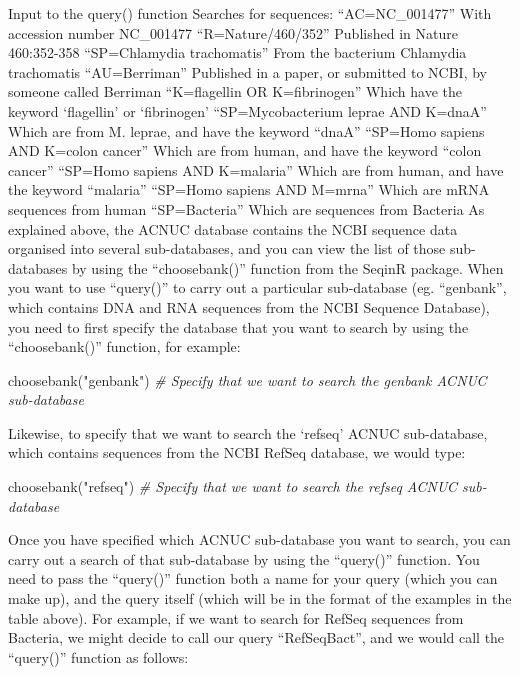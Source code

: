 \documentclass[
]{book}
\newenvironment{Shaded}{\begin{snugshade}}{\end{snugshade}}
\newcommand{\CommentTok}[1]{\textcolor[rgb]{0.56,0.35,0.01}{\textit{#1}}}
\newcommand{\FunctionTok}[1]{\textcolor[rgb]{0.00,0.00,0.00}{#1}}
\newcommand{\NormalTok}[1]{#1}
\newcommand{\StringTok}[1]{\textcolor[rgb]{0.31,0.60,0.02}{#1}}
\begin{document}
Input to the query() function Searches for sequences:
``AC=NC\_001477'' With accession number NC\_001477
``R=Nature/460/352'' Published in Nature 460:352-358
``SP=Chlamydia trachomatis'' From the bacterium Chlamydia trachomatis
``AU=Berriman'' Published in a paper, or submitted to NCBI, by someone called Berriman
``K=flagellin OR K=fibrinogen'' Which have the keyword `flagellin' or `fibrinogen'
``SP=Mycobacterium leprae AND K=dnaA'' Which are from M. leprae, and have the keyword ``dnaA''
``SP=Homo sapiens AND K=colon cancer'' Which are from human, and have the keyword ``colon cancer''
``SP=Homo sapiens AND K=malaria'' Which are from human, and have the keyword ``malaria''
``SP=Homo sapiens AND M=mrna'' Which are mRNA sequences from human
``SP=Bacteria'' Which are sequences from Bacteria
As explained above, the ACNUC database contains the NCBI sequence data organised into several sub-databases, and you can view the list of those sub-databases by using the ``choosebank()'' function from the SeqinR package. When you want to use ``query()'' to carry out a particular sub-database (eg. ``genbank'', which contains DNA and RNA sequences from the NCBI Sequence Database), you need to first specify the database that you want to search by using the ``choosebank()'' function, for example:

\begin{Shaded}
\begin{Highlighting}[]
\FunctionTok{choosebank}\NormalTok{(}\StringTok{"genbank"}\NormalTok{) }\CommentTok{\# Specify that we want to search the \textquotesingle{}genbank\textquotesingle{} ACNUC sub{-}database}
\end{Highlighting}
\end{Shaded}

Likewise, to specify that we want to search the `refseq' ACNUC sub-database, which contains sequences from the NCBI RefSeq database, we would type:

\begin{Shaded}
\begin{Highlighting}[]
\FunctionTok{choosebank}\NormalTok{(}\StringTok{"refseq"}\NormalTok{) }\CommentTok{\# Specify that we want to search the \textquotesingle{}refseq\textquotesingle{} ACNUC sub{-}database}
\end{Highlighting}
\end{Shaded}

Once you have specified which ACNUC sub-database you want to search, you can carry out a search of that sub-database by using the ``query()'' function. You need to pass the ``query()'' function both a name for your query (which you can make up), and the query itself (which will be in the format of the examples in the table above). For example, if we want to search for RefSeq sequences from Bacteria, we might decide to call our query ``RefSeqBact'', and we would call the ``query()'' function as follows:
\end{document}
